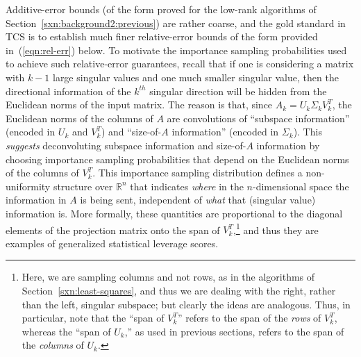 \documentclass[twoside]{article}
\begin{document}
Additive-error bounds (of the form proved for the low-rank algorithms of 
Section~\ref{sxn:background2:previous}) are rather coarse, and the gold 
standard in TCS is to establish much finer relative-error bounds of the 
form provided in~(\ref{eqn:rel-err}) below.
To motivate the importance sampling probabilities used to achieve such 
relative-error guarantees, recall that if one is considering a matrix with 
$k-1$ large singular values and one much smaller singular value, then the 
directional information of the $k^{th}$ singular direction will be hidden 
from the Euclidean norms of the input matrix.
The reason is that, since $A_k=U_k \Sigma_k V_k^T$, the 
Euclidean norms of the columns of $A$ are convolutions of ``subspace 
information'' (encoded in $U_k$ and $V_k^T$) and ``size-of-$A$ information'' 
(encoded in $\Sigma_k$).
This \emph{suggests} deconvoluting subspace information and size-of-$A$ 
information by choosing importance sampling probabilities that depend on the
Euclidean norms of the columns of $V_k^T$.
This importance sampling distribution defines a non-uniformity 
structure over $\mathbb{R}^{n}$ that indicates \emph{where} in the 
$n$-dimensional space the information in $A$ is being sent, independent of 
\emph{what} that (singular value) information is.
More formally, these quantities are proportional to the diagonal elements 
of the projection matrix onto the span of $V_k^T$,\footnote{Here, we are sampling columns and not rows, as in the algorithms 
of Section~\ref{sxn:least-squares}, and thus we are dealing with the right,
rather than the left, singular subspace; but clearly the ideas 
are analogous.  Thus, in particular, note that the ``span of $V_k^T$'' 
refers to the span of the \emph{rows} of $V_k^T$, whereas the ``span of 
$U_k$,'' as used in previous sections, refers to the span of the 
\emph{columns} of $U_k$.}
and thus they are examples of generalized statistical leverage scores. 
\end{document}
